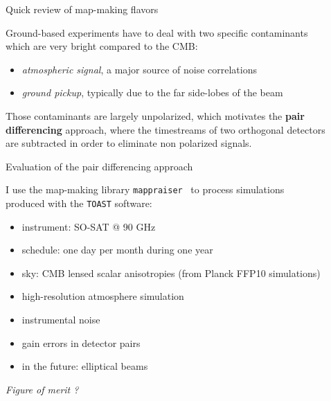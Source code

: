 \documentclass[final]{beamer}
\newlength{\sepwidth}
\newlength{\colwidth}
\newcommand{\separatorcolumn}{\begin{column}{\sepwidth}\end{column}}
\begin{document}
\begin{frame}[t]
\begin{columns}[t]
\begin{column}{\colwidth}
\begin{alertblock}{Quick review of map-making flavors}

        Ground-based experiments have to deal with two specific contaminants which are very bright compared to the CMB:

        \begin{itemize}
          \item \emph{atmospheric signal}, a major source of noise correlations
          \item \emph{ground pickup}, typically due to the far side-lobes of the beam
        \end{itemize}

        Those contaminants are largely unpolarized, which motivates the \textbf{pair differencing} approach, where the timestreams of two orthogonal detectors are subtracted in order to eliminate non polarized signals.

      \end{alertblock}

      \begin{block}{Evaluation of the pair differencing approach}

        I use the map-making library \texttt{mappraiser}~\cite{ElBouhargani:2021umq} to process simulations produced with the \texttt{TOAST} software:

        \begin{itemize}
          \item instrument: SO-SAT @ 90 GHz
          \item schedule: one day per month during one year
          \item sky: CMB lensed scalar anisotropies (from Planck FFP10 simulations)
          \item high-resolution atmosphere simulation
          \item instrumental noise
          \item gain errors in detector pairs
          \item in the future: elliptical beams
        \end{itemize}

        \emph{Figure of merit ?}

      \end{block}

    \end{column}

    \separatorcolumn

    \begin{column}{\colwidth}


\end{column}
\end{columns}
\end{frame}
\end{document}
